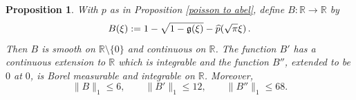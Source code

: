 \documentclass[12pt,reqno]{amsart}
\theoremstyle{plain}
\newtheorem{proposition}[theorem]{Proposition}
\numberwithin{equation}{section}
\theoremstyle{remark}
\newcommand{\uses}[1]{}
\newcommand{\usesdefs}[1]{}
\newcommand{\R}{{\mathbb R}}
\begin{document}
\begin{proposition}\label{auxiliary function B}\uses{square root one minus Gaussian,poisson to abel}\usesdefs{gaussian}
    With $p$ as in Proposition \ref{poisson to abel}, define $B:\R\to \R$ by
\begin{equation}\label{auto:Gaussian-square-root-remainder}
    B(\xi):=1-\sqrt{1-\mathfrak{g}(\xi)}-\widehat{p}(\sqrt{\pi}\xi)\, .
\end{equation}
Then $B$ is smooth on $\R\setminus \{0\}$ and continuous on $\R$. The function $B'$
has a continuous extension to $\R$ which is integrable and the
function $B''$, extended to be $0$ at $0$, is Borel measurable and integrable on $\R$.
Moreover,
\begin{equation}\label{eq:B-explicit-norms}
    \|B\|_1\le 6,\qquad
    \|B'\|_1\le 12,\qquad
    \|B''\|_1\le 68.
\end{equation}
\end{proposition}
\end{document}
